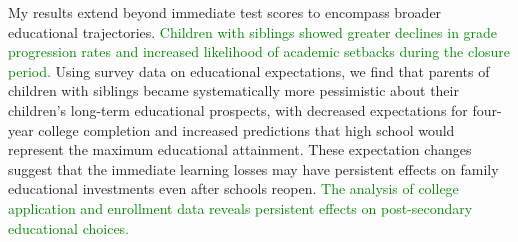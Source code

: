 My results extend beyond immediate test scores to encompass broader educational trajectories. \textcolor{green}{Children with siblings showed greater declines in grade progression rates and increased likelihood of academic setbacks during the closure period.} Using survey data on educational expectations, we find that parents of children with siblings became systematically more pessimistic about their children's long-term educational prospects, with decreased expectations for four-year college completion and increased predictions that high school would represent the maximum educational attainment. These expectation changes suggest that the immediate learning losses may have persistent effects on family educational investments even after schools reopen. \textcolor{green}{The analysis of college application and enrollment data reveals persistent effects on post-secondary educational choices.}



